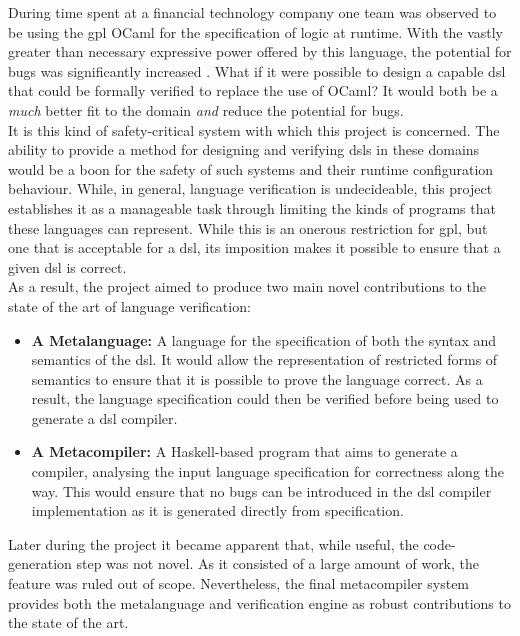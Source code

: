 During time spent at a financial technology company one team was observed to be using the \gls{gpl} OCaml for the specification of logic at runtime. 
With the vastly greater than necessary expressive power offered by this language, the potential for bugs was significantly increased \citep{subramanyam2003empirical}.
What if it were possible to design a capable \gls{dsl} that could be formally verified to replace the use of OCaml?
It would both be a \textit{much} better fit to the domain \textit{and} reduce the potential for bugs.\\

It is this kind of safety-critical system with which this project is concerned.
The ability to provide a method for designing and verifying \glspl{dsl} in these domains would be a boon for the safety of such systems and their runtime configuration behaviour.
While, in general, language verification is undecideable, this project establishes it as a manageable task through limiting the kinds of programs that these languages can represent.
While this is an onerous restriction for \gls{gpl}, but one that is acceptable for a \gls{dsl}, its imposition makes it possible to ensure that a given \gls{dsl} is correct.\\

As a result, the project aimed to produce two main novel contributions to the state of the art of language verification:
\begin{itemize}
    \item \textbf{A Metalanguage:} A language for the specification of both the \gls{syntax} and \gls{semantics} of the \gls{dsl}. 
    It would allow the representation of restricted forms of semantics to ensure that it is possible to prove the language correct.
    As a result, the language specification could then be verified before being used to generate a \gls{dsl} compiler. 
    \item \textbf{A Metacompiler:} A Haskell-based program that aims to generate a compiler, analysing the input language specification for correctness along the way.
    This would ensure that no bugs can be introduced in the \gls{dsl} compiler implementation as it is generated directly from specification.
\end{itemize}

Later during the project it became apparent that, while useful, the code-generation step was not novel.
As it consisted of a large amount of work, the feature was ruled out of scope.
Nevertheless, the final metacompiler system provides both the metalanguage and verification engine as robust contributions to the state of the art. 

